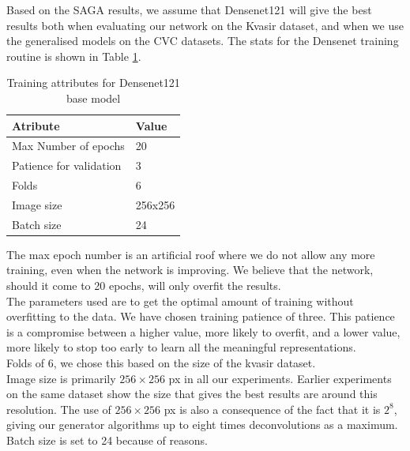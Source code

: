 Based on the SAGA results, we assume that Densenet121 will give the best results both when evaluating our network on the Kvasir dataset, and when we use the generalised models on the CVC datasets.
The stats for the Densenet training routine is shown in Table \ref{tab:TrainingAttrDN121}.



\begin{table}[h]
\caption{Training attributes for Densenet121 base model }
\begin{center}
\begin{tabular}{ll}
\toprule
Atribute                & Value   \\
\midrule
Max Number of epochs    & 20      \\
Patience for validation & 3       \\
Folds                   & 6       \\
Image size              & 256x256 \\
Batch size              & 24      \\   
\bottomrule
\end{tabular}
\end{center}
\label{tab:TrainingAttrDN121}
\end{table}


The max epoch number is an artificial roof where we do not allow any more training, even when the network is improving.  We believe that the network, should it come to 20 epochs, will only overfit the results.\\
\vspace{5px}
The parameters used are to get the optimal amount of training without overfitting to the data. We have chosen training patience of three. This patience is a compromise between a higher value, more likely to overfit, and a lower value, more likely to stop too early to learn all the meaningful representations. \\
\vspace{5px}
Folds of 6, we chose this based on the size of the kvasir dataset. \\ 
\vspace{5px}
Image size is primarily $256 \times 256$ px in all our experiments. Earlier experiments on the same dataset show the size that gives the best results are around this resolution. The use of $256 \times 256$ px is also a consequence of the fact that it is $2^8$, giving our generator algorithms up to eight times deconvolutions as a maximum.\\
\vspace{5px}
Batch size is set to 24 because of reasons. \\ 


